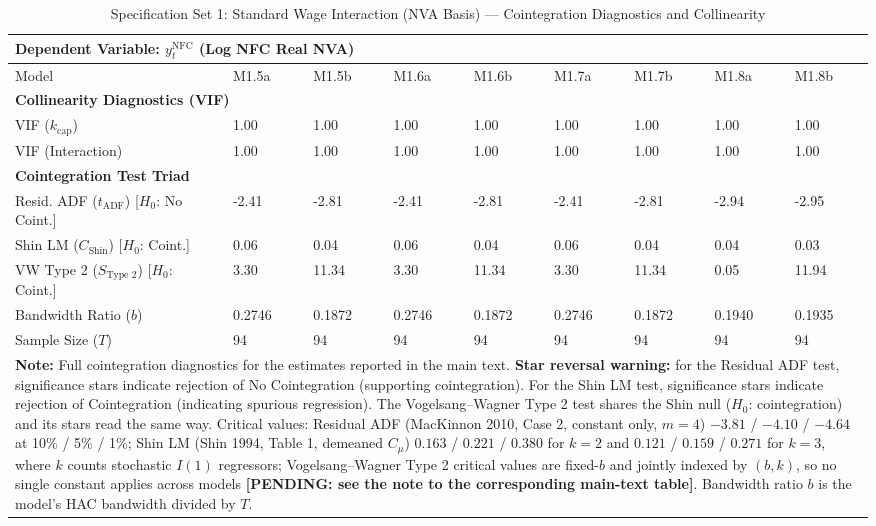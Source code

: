 \begin{table}[H]
\centering
\setlength{\tabcolsep}{2.5pt}
\caption{Specification Set 1: Standard Wage Interaction (NVA Basis) --- Cointegration Diagnostics and Collinearity}
\label{tab:specA_set1_nva_triad}
\scriptsize
\begin{tabular}{p{3.8cm}p{1.1cm}p{1.1cm}p{1.1cm}p{1.1cm}p{1.1cm}p{1.1cm}p{1.1cm}p{1.1cm}}
\toprule
\multicolumn{9}{l}{\textbf{Dependent Variable: $y_t^{\text{NFC}}$ (Log NFC Real NVA)}} \\
\midrule
Model & M1.5a & M1.5b & M1.6a & M1.6b & M1.7a & M1.7b & M1.8a & M1.8b \\
\midrule
\multicolumn{9}{l}{\textbf{Collinearity Diagnostics (VIF)}} \\
VIF ($k_{\text{cap}}$) & 1.00 & 1.00 & 1.00 & 1.00 & 1.00 & 1.00 & 1.00 & 1.00 \\
VIF (Interaction) & 1.00 & 1.00 & 1.00 & 1.00 & 1.00 & 1.00 & 1.00 & 1.00 \\
\midrule
\multicolumn{9}{l}{\textbf{Cointegration Test Triad}} \\
Resid. ADF ($t_{\text{ADF}}$) [$H_0$: No Coint.] & -2.41 & -2.81 & -2.41 & -2.81 & -2.41 & -2.81 & -2.94 & -2.95 \\
Shin LM ($C_{\text{Shin}}$) [$H_0$: Coint.] & 0.06 & 0.04 & 0.06 & 0.04 & 0.06 & 0.04 & 0.04 & 0.03 \\
VW Type 2 ($S_{\text{Type 2}}$) [$H_0$: Coint.] & 3.30 & 11.34 & 3.30 & 11.34 & 3.30 & 11.34 & 0.05 & 11.94 \\
\midrule
Bandwidth Ratio ($b$) & 0.2746 & 0.1872 & 0.2746 & 0.1872 & 0.2746 & 0.1872 & 0.1940 & 0.1935 \\
Sample Size ($T$) & 94 & 94 & 94 & 94 & 94 & 94 & 94 & 94 \\
\bottomrule
\multicolumn{9}{p{14.5cm}}{\footnotesize \textbf{Note:} Full cointegration diagnostics for the estimates reported in the main text. \textbf{Star reversal warning:} for the Residual ADF test, significance stars indicate rejection of No Cointegration (supporting cointegration). For the Shin LM test, significance stars indicate rejection of Cointegration (indicating spurious regression). The Vogelsang--Wagner Type 2 test shares the Shin null ($H_0$: cointegration) and its stars read the same way. Critical values: Residual ADF (MacKinnon 2010, Case 2, constant only, $m=4$) $-3.81$ / $-4.10$ / $-4.64$ at 10\% / 5\% / 1\%; Shin LM (Shin 1994, Table 1, demeaned $C_\mu$) $0.163$ / $0.221$ / $0.380$ for $k=2$ and $0.121$ / $0.159$ / $0.271$ for $k=3$, where $k$ counts stochastic $I(1)$ regressors; Vogelsang--Wagner Type 2 critical values are fixed-$b$ and jointly indexed by $(b, k)$, so no single constant applies across models \textbf{[PENDING: see the note to the corresponding main-text table]}. Bandwidth ratio $b$ is the model's HAC bandwidth divided by $T$.} \\
\end{tabular}
\end{table}

